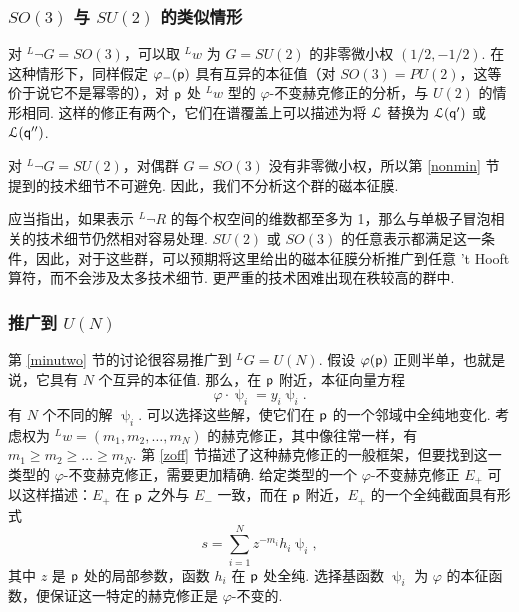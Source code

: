 \subsubsection{$SO(3)$ 与 $SU(2)$ 的类似情形}\label{anagroups}

对 $^L\neg G=SO(3)$，可以取 $^Lw$ 为 $G=SU(2)$ 的非零微小权 $(1/2,-1/2)$.
在这种情形下，同样假定 $\varphi_-({\sf p})$ 具有互异的本征值（对 $SO(3)=PU(2)$，这等价于说它不是幂零的），对 ${\sf p}$ 处 $^Lw$ 型的 $\varphi$-不变赫克修正的分析，与 $U(2)$ 的情形相同.
这样的修正有两个，它们在谱覆盖上可以描述为将 ${\mathcal L}$ 替换为 ${\mathcal L}({\sf q}')$ 或 ${\mathcal L}({\sf q}'')$.

对 $^L\neg G=SU(2)$，对偶群 $G=SO(3)$ 没有非零微小权，所以第 \ref{nonmin} 节提到的技术细节不可避免.
因此，我们不分析这个群的磁本征膜.

应当指出，如果表示 $^L\neg R$ 的每个权空间的维数都至多为 1，那么与单极子冒泡相关的技术细节仍然相对容易处理.
$SU(2)$ 或 $SO(3)$ 的任意表示都满足这一条件，因此，对于这些群，可以预期将这里给出的磁本征膜分析推广到任意 't Hooft 算符，而不会涉及太多技术细节.
更严重的技术困难出现在秩较高的群中.



\subsubsection{推广到 $U(N)$}

第 \ref{minutwo} 节的讨论很容易推广到 $^LG=U(N)$.
假设 $\varphi({\sf p})$ 正则半单，也就是说，它具有 $N$ 个互异的本征值.
那么，在 ${\sf p}$ 附近，本征向量方程
\begin{equation}
\label{oxonik}\varphi\cdot
\uppsi_i=y_i\uppsi_i.
\end{equation}
有 $N$ 个不同的解 $\uppsi_i$.
可以选择这些解，使它们在 ${\sf p}$ 的一个邻域中全纯地变化.
考虑权为 $^Lw=(m_1,m_2,\dots,m_N)$ 的赫克修正，其中像往常一样，有 $m_1\geq
m_2\geq\dots\geq m_N$.
第 \ref{zoff} 节描述了这种赫克修正的一般框架，但要找到这一类型的 $\varphi$-不变赫克修正，需要更加精确.
给定类型的一个 $\varphi$-不变赫克修正 $E_+$ 可以这样描述：$E_+$ 在 ${\sf p}$ 之外与 $E_-$ 一致，而在 ${\sf p}$ 附近，$E_+$ 的一个全纯截面具有形式
\begin{equation}
\label{zno}
s=\sum_{i=1}^N z^{-m_i}h_i\uppsi_i,
\end{equation}
其中 $z$ 是 ${\sf p}$ 处的局部参数，函数 $h_i$ 在 ${\sf p}$ 处全纯.
选择基函数 $\uppsi_i$ 为 $\varphi$ 的本征函数，便保证这一特定的赫克修正是 $\varphi$-不变的.

